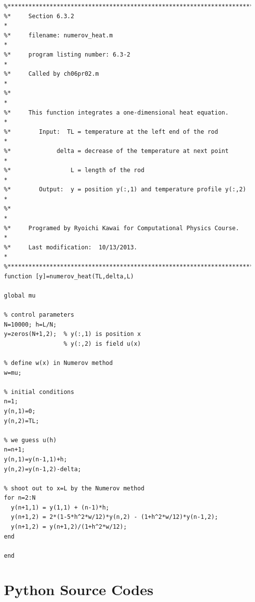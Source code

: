 \bigskip
\begin{verbatim}
%**************************************************************************
%*     Section 6.3.2                                                      *
%*     filename: numerov_heat.m                                           *
%*     program listing number: 6.3-2                                      *
%*     Called by ch06pr02.m                                               *
%*                                                                        *
%*     This function integrates a one-dimensional heat equation.          *
%*        Input:  TL = temperature at the left end of the rod             *
%*             delta = decrease of the temperature at next point          *
%*                 L = length of the rod                                  *
%*        Output:  y = position y(:,1) and temperature profile y(:,2)     *
%*                                                                        *
%*     Programed by Ryoichi Kawai for Computational Physics Course.       *
%*     Last modification:  10/13/2013.                                    *
%**************************************************************************
function [y]=numerov_heat(TL,delta,L)

global mu

% control parameters
N=10000; h=L/N;
y=zeros(N+1,2);  % y(:,1) is position x
                 % y(:,2) is field u(x)

% define w(x) in Numerov method
w=mu;

% initial conditions
n=1;
y(n,1)=0;
y(n,2)=TL;

% we guess u(h)
n=n+1;
y(n,1)=y(n-1,1)+h;
y(n,2)=y(n-1,2)-delta;

% shoot out to x=L by the Numerov method
for n=2:N
  y(n+1,1) = y(1,1) + (n-1)*h;
  y(n+1,2) = 2*(1-5*h^2*w/12)*y(n,2) - (1+h^2*w/12)*y(n-1,2);
  y(n+1,2) = y(n+1,2)/(1+h^2*w/12);
end

end
\end{verbatim}
\normalsize

\bigskip
\noindent
\section*{Python Source Codes}
\setcounter{program}{0}

